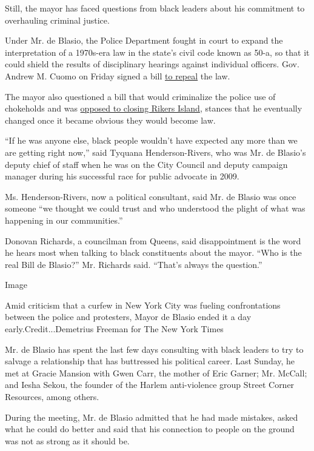 Still, the mayor has faced questions from black leaders about his
commitment to overhauling criminal justice.

Under Mr. de Blasio, the Police Department fought in court to expand the
interpretation of a 1970s-era law in the state's civil code known as
50-a, so that it could shield the results of disciplinary hearings
against individual officers. Gov. Andrew M. Cuomo on Friday signed a
bill
\href{https://www.nytimes3xbfgragh.onion/2020/06/08/nyregion/floyd-protests-police-reform.html}{to
repeal} the law.

The mayor also questioned a bill that would criminalize the police use
of chokeholds and was
\href{https://www.nytimes3xbfgragh.onion/2016/02/17/nyregion/de-blasio-says-idea-of-closing-rikers-jail-complex-is-unrealistic.html}{opposed
to closing Rikers Island}, stances that he eventually changed once it
became obvious they would become law.

``If he was anyone else, black people wouldn't have expected any more
than we are getting right now,'' said Tyquana Henderson-Rivers, who was
Mr. de Blasio's deputy chief of staff when he was on the City Council
and deputy campaign manager during his successful race for public
advocate in 2009.

Ms. Henderson-Rivers, now a political consultant, said Mr. de Blasio was
once someone ``we thought we could trust and who understood the plight
of what was happening in our communities.''

Donovan Richards, a councilman from Queens, said disappointment is the
word he hears most when talking to black constituents about the mayor.
``Who is the real Bill de Blasio?'' Mr. Richards said. ``That's always
the question.''

Image

Amid criticism that a curfew in New York City was fueling confrontations
between the police and protesters, Mayor de Blasio ended it a day
early.Credit...Demetrius Freeman for The New York Times

Mr. de Blasio has spent the last few days consulting with black leaders
to try to salvage a relationship that has buttressed his political
career. Last Sunday, he met at Gracie Mansion with Gwen Carr, the mother
of Eric Garner; Mr. McCall; and Iesha Sekou, the founder of the Harlem
anti-violence group Street Corner Resources, among others.

During the meeting, Mr. de Blasio admitted that he had made mistakes,
asked what he could do better and said that his connection to people on
the ground was not as strong as it should be.

